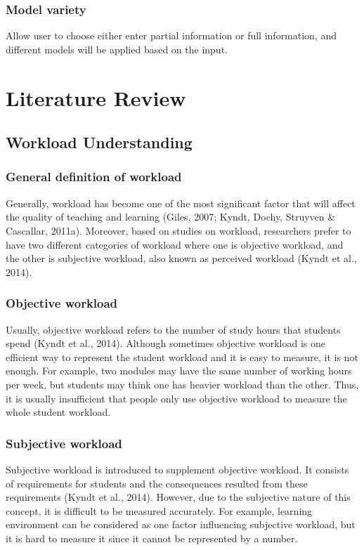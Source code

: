 \documentclass[fyp]{socreport}
\begin{document}
\subsection{Model variety}
Allow user to choose either enter partial information or full information, and different models will be applied based on the input.

\chapter{Literature Review}
\section{Workload Understanding}
\subsection{General definition of workload}
Generally, workload has become one of the most significant factor that will affect the quality of teaching and learning (Giles, 2007; Kyndt, Dochy, Struyven \& Cascallar, 2011a). Moreover, based on studies on workload, researchers prefer to have two different categories of workload where one is objective workload, and the other is subjective workload, also known as perceived workload (Kyndt et al., 2014).

\subsection{Objective workload}
Usually, objective workload refers to the number of study hours that students spend (Kyndt et al., 2014). Although sometimes objective workload is one efficient way to represent the student workload and it is easy to measure, it is not enough. For example, two modules may have the same number of working hours per week, but students may think one has heavier workload than the other. Thus, it is usually insufficient that people only use objective workload to measure the whole student workload.

\subsection{Subjective workload}
Subjective workload is introduced to supplement objective workload. It consists of requirements for students and the consequences resulted from these requirements (Kyndt et al., 2014). However, due to the subjective nature of this concept, it is difficult to be measured accurately. For example, learning environment can be considered as one factor influencing subjective workload, but it is hard to measure it since it cannot be represented by a number.
\end{document}

